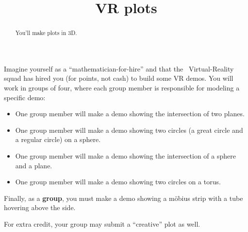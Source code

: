 \documentclass{ximera}
\title{VR plots}
\begin{document}
\begin{abstract}
  You'll make plots in 3D.
\end{abstract}
\maketitle

Imagine yourself as a ``mathematician-for-hire'' and that the
\mooculus\ Virtual-Reality squad has hired you (for points, not cash)
to build some VR demos. You will work in groups of four, where each
group member is responsible for modeling a specific demo:
\begin{itemize}
\item One group member will make a demo showing the intersection of
  two planes.
\item One group member will make a demo showing two circles (a great
  circle and a regular circle) on a sphere.
\item One group member will make a demo showing the intersection of a
  sphere and a plane.
\item One group member will make a demo showing two circles on a
  torus.
\end{itemize}
Finally, as a \textbf{group}, you must make a demo showing a m\"obius
strip with a tube hovering above the side.

For extra credit, your group may submit a ``creative'' plot as well.
\end{document}
